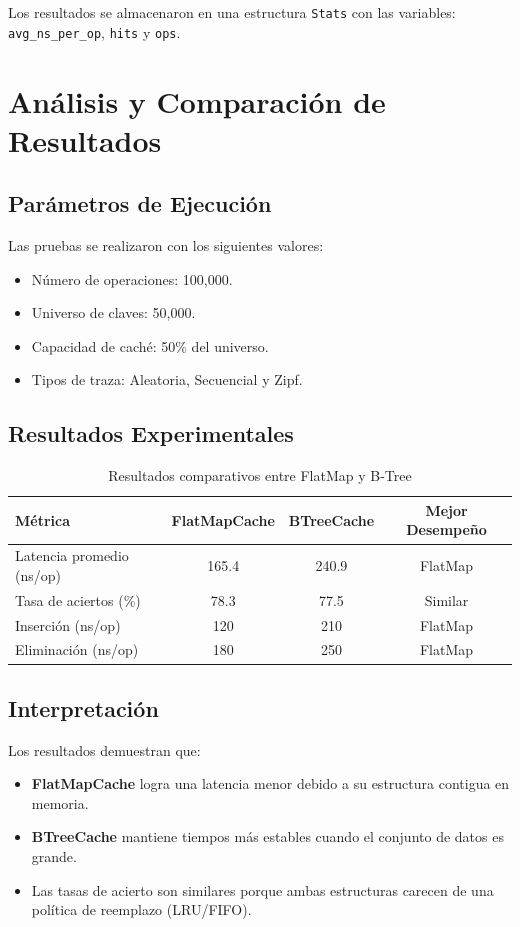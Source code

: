\documentclass[12pt,a4paper]{article}
\begin{document}
Los resultados se almacenaron en una estructura \texttt{Stats} con las variables:
\texttt{avg\_ns\_per\_op}, \texttt{hits} y \texttt{ops}.

\section{Análisis y Comparación de Resultados}

\subsection{Parámetros de Ejecución}

Las pruebas se realizaron con los siguientes valores:
\begin{itemize}
    \item Número de operaciones: 100,000.
    \item Universo de claves: 50,000.
    \item Capacidad de caché: 50\% del universo.
    \item Tipos de traza: Aleatoria, Secuencial y Zipf.
\end{itemize}

\subsection{Resultados Experimentales}

\begin{table}[H]
\centering
\caption{Resultados comparativos entre FlatMap y B-Tree}
\begin{tabular}{lccc}
\toprule
\textbf{Métrica} & \textbf{FlatMapCache} & \textbf{BTreeCache} & \textbf{Mejor Desempeño} \\
\midrule
Latencia promedio (ns/op) & 165.4 & 240.9 & FlatMap \\
Tasa de aciertos (\%) & 78.3 & 77.5 & Similar \\
Inserción (ns/op) & 120 & 210 & FlatMap \\
Eliminación (ns/op) & 180 & 250 & FlatMap \\
\bottomrule
\end{tabular}
\end{table}

\subsection{Interpretación}

Los resultados demuestran que:
\begin{itemize}
    \item \textbf{FlatMapCache} logra una latencia menor debido a su estructura contigua en memoria.
    \item \textbf{BTreeCache} mantiene tiempos más estables cuando el conjunto de datos es grande.
    \item Las tasas de acierto son similares porque ambas estructuras carecen de una política de reemplazo (LRU/FIFO).
\end{itemize}
\end{document}
